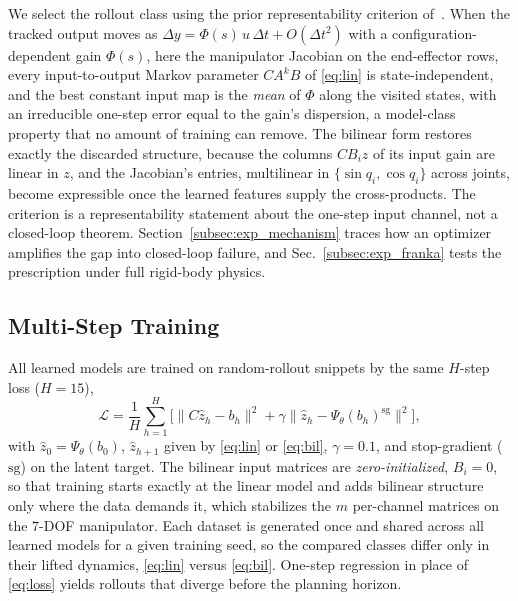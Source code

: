 \documentclass[letterpaper,10pt,conference]{ieeeconf}
\begin{document}
We select the rollout class using the prior representability criterion of~\cite{kim2026bilinear}.
When the tracked output moves as $\Delta y = \Phi(s)\, u\, \Delta t + O(\Delta t^{2})$ with a configuration-dependent gain $\Phi(s)$, here the manipulator Jacobian on the end-effector rows, every input-to-output Markov parameter $C A^{k} B$ of \eqref{eq:lin} is state-independent, and the best constant input map is the \emph{mean} of $\Phi$ along the visited states, with an irreducible one-step error equal to the gain's dispersion, a model-class property that no amount of training can remove.
The bilinear form restores exactly the discarded structure, because the columns $C B_i z$ of its input gain are linear in $z$, and the Jacobian's entries, multilinear in $\{\sin q_i, \cos q_i\}$ across joints, become expressible once the learned features supply the cross-products.
The criterion is a representability statement about the one-step input channel, not a closed-loop theorem. Section~\ref{subsec:exp_mechanism} traces how an optimizer amplifies the gap into closed-loop failure, and Sec.~\ref{subsec:exp_franka} tests the prescription under full rigid-body physics.

\subsection{Multi-Step Training}\label{subsec:training}

All learned models are trained on random-rollout snippets by the same $H$-step loss ($H = 15$),
\begin{equation}
\mathcal{L} = \frac{1}{H} \sum_{h=1}^{H}
\Big[ \big\| C \hat{z}_h - b_h \big\|^{2}
+ \gamma \big\| \hat{z}_h - \Psi_\theta(b_h)^{\mathrm{sg}} \big\|^{2}
\Big],
\label{eq:loss}
\end{equation}
with $\hat z_0 = \Psi_\theta(b_0)$, $\hat z_{h+1}$ given by \eqref{eq:lin} or \eqref{eq:bil}, $\gamma = 0.1$, and stop-gradient ($\mathrm{sg}$) on the latent target.
The bilinear input matrices are \emph{zero-initialized}, $B_i = 0$, so that training starts exactly at the linear model and adds bilinear structure only where the data demands it, which stabilizes the $m$ per-channel matrices on the $7$-DOF manipulator.
Each dataset is generated once and shared across all learned models for a given training seed, so the compared classes differ only in their lifted dynamics, \eqref{eq:lin} versus \eqref{eq:bil}.
One-step regression in place of \eqref{eq:loss} yields rollouts that diverge before the planning horizon.
\end{document}
